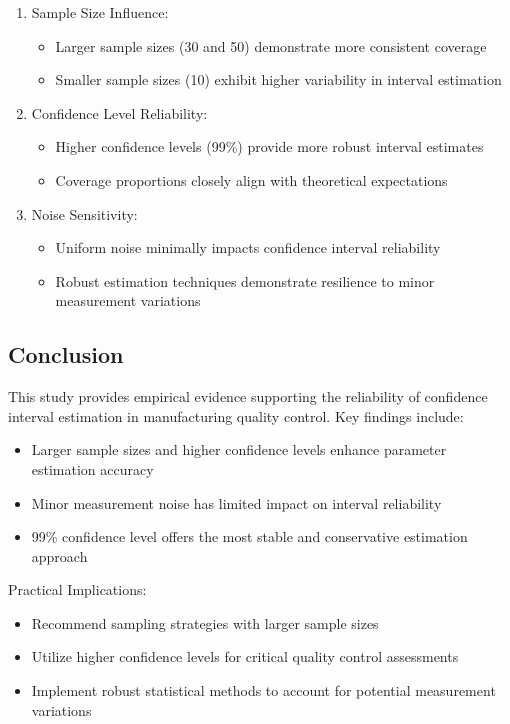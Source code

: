 \documentclass[12pt]{article}
\begin{document}
\begin{enumerate}
    \item Sample Size Influence:
    \begin{itemize}
        \item Larger sample sizes (30 and 50) demonstrate more consistent coverage
        \item Smaller sample sizes (10) exhibit higher variability in interval estimation
    \end{itemize}
    
    \item Confidence Level Reliability:
    \begin{itemize}
        \item Higher confidence levels (99\%) provide more robust interval estimates
        \item Coverage proportions closely align with theoretical expectations
    \end{itemize}
    
    \item Noise Sensitivity:
    \begin{itemize}
        \item Uniform noise minimally impacts confidence interval reliability
        \item Robust estimation techniques demonstrate resilience to minor measurement variations
    \end{itemize}
\end{enumerate}

\subsection{Conclusion}
This study provides empirical evidence supporting the reliability of confidence interval estimation in manufacturing quality control. Key findings include:

\begin{itemize}
    \item Larger sample sizes and higher confidence levels enhance parameter estimation accuracy
    \item Minor measurement noise has limited impact on interval reliability
    \item 99\% confidence level offers the most stable and conservative estimation approach
\end{itemize}

Practical Implications:
\begin{itemize}
    \item Recommend sampling strategies with larger sample sizes
    \item Utilize higher confidence levels for critical quality control assessments
    \item Implement robust statistical methods to account for potential measurement variations
\end{itemize}
\end{document}
